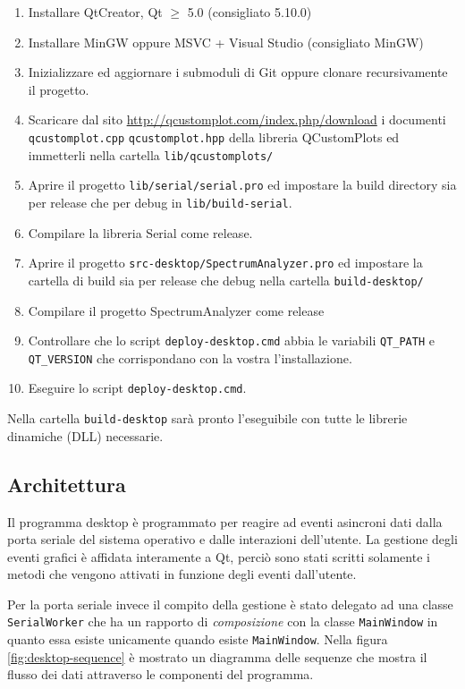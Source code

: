 \begin{enumerate}
\item Installare QtCreator, Qt \(\geq\) 5.0 (consigliato 5.10.0)
\item Installare MinGW oppure MSVC + Visual Studio (consigliato MinGW)
\item Inizializzare ed aggiornare i submoduli di Git oppure clonare
    recursivamente il progetto.
\item Scaricare dal sito \url{http://qcustomplot.com/index.php/download} i
    documenti \texttt{qcustomplot.cpp} \texttt{qcustomplot.hpp} della libreria
    QCustomPlots ed immetterli nella cartella \texttt{lib/qcustomplots/}
\item Aprire il progetto \texttt{lib/serial/serial.pro} ed impostare la
    build directory sia per release che per debug in \texttt{lib/build-serial}.
\item Compilare la libreria Serial come release.
\item Aprire il progetto \texttt{src-desktop/SpectrumAnalyzer.pro} ed
    impostare la cartella di build sia per release che debug nella cartella
        \texttt{build-desktop/}
\item Compilare il progetto SpectrumAnalyzer come release
\item Controllare che lo script \texttt{deploy-desktop.cmd} abbia le variabili
    \texttt{QT\_PATH} e \texttt{QT\_VERSION} che corrispondano con la vostra
    l'installazione.
\item Eseguire lo script \texttt{deploy-desktop.cmd}.
\end{enumerate}
Nella cartella \texttt{build-desktop} sar\`a pronto l'eseguibile con tutte le
librerie dinamiche (DLL) necessarie.

\subsection{Architettura}
Il programma desktop \`e programmato per reagire ad eventi asincroni dati dalla
porta seriale del sistema operativo e dalle interazioni dell'utente.
La gestione degli eventi grafici \`e affidata interamente a Qt, perci\`o sono
stati scritti solamente i metodi che vengono attivati in funzione degli eventi
dall'utente.

Per la porta seriale invece il compito della gestione \`e stato delegato ad
una classe \texttt{SerialWorker} che ha un rapporto di \emph{composizione} con
la classe \texttt{MainWindow} in quanto essa esiste unicamente quando esiste
\texttt{MainWindow}. Nella figura \ref{fig:desktop-sequence} \`e mostrato un
diagramma delle sequenze che mostra il flusso dei dati attraverso le
componenti del programma.

